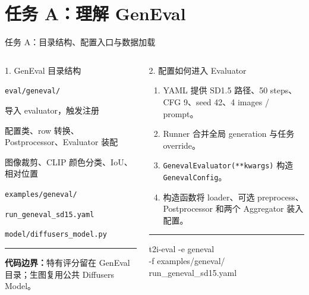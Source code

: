 \documentclass[aspectratio=169,10pt]{beamer}
\begin{document}
\section{任务 A：理解 GenEval}
\begin{frame}{任务 A：目录结构、配置入口与数据加载}
  \begin{columns}[T,onlytextwidth]
      \begin{block}{1. GenEval 目录结构}
        \begin{minipage}[c][5.05cm][c]{\linewidth}
          \scriptsize
          \texttt{eval/geneval/}
          \begin{description}\scriptsize
            \item[\texttt{\_\_init\_\_.py}] 导入 evaluator，触发注册
            \item[\texttt{evaluator.py}] 配置类、row 转换、Postprocessor、Evaluator 装配
            \item[\texttt{utils.py}] 图像裁剪、CLIP 颜色分类、IoU、相对位置
          \end{description}
          \vspace{0.15em}
          \texttt{examples/geneval/}\par
          \texttt{run\_geneval\_sd15.yaml}\par
          \texttt{model/diffusers\_model.py}
          \vspace{0.45em}
          \color{T2IGray}\rule{\linewidth}{0.35pt}\par\vspace{0.3em}
          \textbf{代码边界：}特有评分留在 GenEval 目录；生图复用公共 Diffusers Model。
        \end{minipage}
      \end{block}

      \begin{block}{2. 配置如何进入 Evaluator}
        \begin{minipage}[c][5.05cm][c]{\linewidth}
          \begin{enumerate}\scriptsize
            \item YAML 提供 SD1.5 路径、50 steps、CFG 9、seed 42、4 images / prompt。
            \item Runner 合并全局 generation 与任务 override。
            \item \texttt{GenevalEvaluator(**kwargs)} 构造 \texttt{GenevalConfig}。
            \item 构造函数将 loader、可选 preprocess、Postprocessor 和两个 Aggregator 装入配置。
          \end{enumerate}
          \vspace{0.45em}
          \color{T2IGray}\rule{\linewidth}{0.35pt}\par\vspace{0.3em}
          \scriptsize\ttfamily
          t2i-eval -e geneval\\
          -f examples/geneval/\\
          \quad run\_geneval\_sd15.yaml
        \end{minipage}
      \end{block}


\end{columns}
\end{frame}
\end{document}
